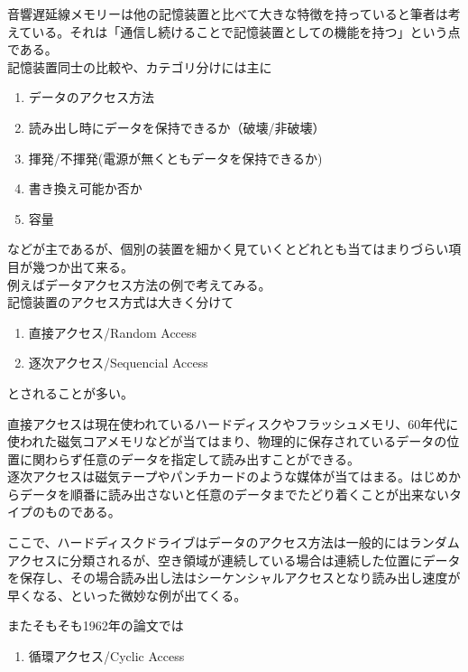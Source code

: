 \documentclass[a4paper,report]{jsbook}
\begin{document}
音響遅延線メモリーは他の記憶装置と比べて大きな特徴を持っていると筆者は考えている。それは「通信し続けることで記憶装置としての機能を持つ」という点である。\\
記憶装置同士の比較や、カテゴリ分けには主に

\begin{enumerate}
\def\labelenumi{\arabic{enumi}.}
\tightlist
\item
  データのアクセス方法
\item
  読み出し時にデータを保持できるか（破壊/非破壊）
\item
  揮発/不揮発(電源が無くともデータを保持できるか)
\item
  書き換え可能か否か
\item
  容量
\end{enumerate}

などが主であるが、個別の装置を細かく見ていくとどれとも当てはまりづらい項目が幾つか出て来る。\\
例えばデータアクセス方法の例で考えてみる。\\
記憶装置のアクセス方式は大きく分けて

\begin{enumerate}
\def\labelenumi{\arabic{enumi}.}
\tightlist
\item
  直接アクセス/Random Access
\item
  逐次アクセス/Sequencial Access
\end{enumerate}

とされることが多い。

直接アクセスは現在使われているハードディスクやフラッシュメモリ、60年代に使われた磁気コアメモリなどが当てはまり、物理的に保存されているデータの位置に関わらず任意のデータを指定して読み出すことができる。\\
逐次アクセスは磁気テープやパンチカードのような媒体が当てはまる。はじめからデータを順番に読み出さないと任意のデータまでたどり着くことが出来ないタイプのものである。

ここで、ハードディスクドライブはデータのアクセス方法は一般的にはランダムアクセスに分類されるが、空き領域が連続している場合は連続した位置にデータを保存し、その場合読み出し法はシーケンシャルアクセスとなり読み出し速度が早くなる、といった微妙な例が出てくる。

またそもそも1962年の論文では

\begin{enumerate}
\def\labelenumi{\arabic{enumi}.}
\tightlist
\item
  循環アクセス/Cyclic Access
\end{enumerate}
\end{document}
